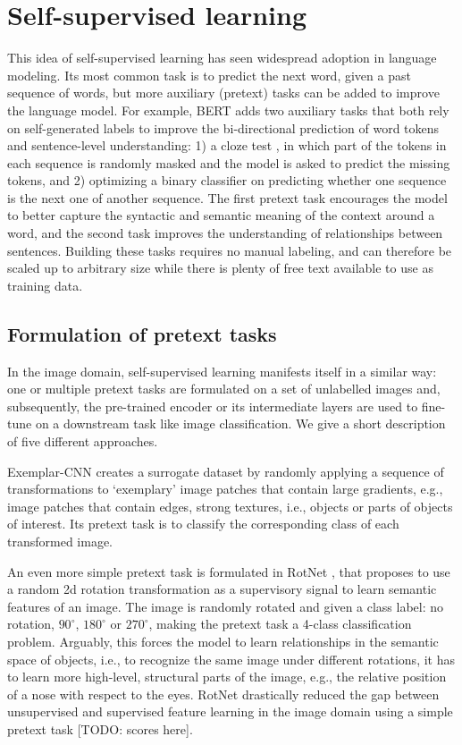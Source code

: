 \section{Self-supervised learning}
This idea of self-supervised learning has seen widespread adoption in language modeling. Its most common task is to predict the next word, given a past sequence of words, but more auxiliary (pretext) tasks can be added to improve the language model. For example, BERT \cite{Devlin2019BERTPO} adds two auxiliary tasks that both rely on self-generated labels to improve the bi-directional prediction of word tokens and sentence-level understanding: 1) a cloze test \cite{doi:10.1177/107769905303000401}, in which part of the tokens in each sequence is randomly masked and the model is asked to predict the missing tokens, and 2) optimizing a binary classifier on predicting whether one sequence is the next one of another sequence. The first pretext task encourages the model to better capture the syntactic and semantic meaning of the context around a word, and the second task improves the understanding of relationships between sentences. Building these tasks requires no manual labeling, and can therefore be scaled up to arbitrary size while there is plenty of free text available to use as training data.\\

\subsection{Formulation of pretext tasks}
In the image domain, self-supervised learning manifests itself in a similar way: one or multiple pretext tasks are formulated on a set of unlabelled images and, subsequently, the pre-trained encoder or its intermediate layers are used to fine-tune on a downstream task like image classification. We give a short description of five different approaches.

Exemplar-CNN \cite{dosovitskiy_discriminative_2014} creates a surrogate dataset by randomly applying a sequence of transformations to `exemplary' image patches that contain large gradients, e.g., image patches that contain edges, strong textures, i.e., objects or parts of objects of interest. Its pretext task is to classify the corresponding class of each transformed image.

An even more simple pretext task is formulated in RotNet \cite{gidaris2018unsupervised}, that proposes to use a random 2d rotation transformation as a supervisory signal to learn semantic features of an image. The image is randomly rotated and given a class label: no rotation, $90^\circ$, $180^\circ$ or $270^\circ$, making the pretext task a 4-class classification problem. Arguably, this forces the model to learn relationships in the semantic space of objects, i.e., to recognize the same image under different rotations, it has to learn more high-level, structural parts of the image, e.g., the relative position of a nose with respect to the eyes. RotNet drastically reduced the gap between unsupervised and supervised feature learning in the image domain using a simple pretext task [TODO: scores here].

